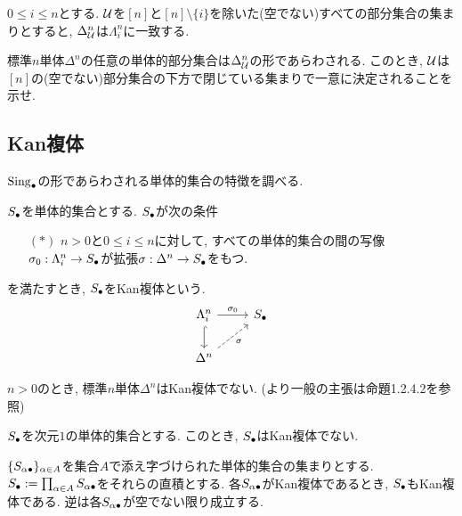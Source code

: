 \documentclass[uplatex, a4paper, 14Q, dvipdfmx]{jsreport}
\begin{document}
\begin{example}
  $0 \leq i \leq n$とする. 
  $\calU$を$[n]$と$[n] \setminus \{i\}$を除いた(空でない)すべての部分集合の集まりとすると, $\Delta^n_\calU$は$\Lambda^n_i$に一致する.
\end{example}

\begin{exe}
  標準$n$単体$\Delta^n$の任意の単体的部分集合は$\Delta^n_\calU$の形であらわされる.
  このとき, $\calU$は$[n]$の(空でない)部分集合の下方で閉じている集まりで一意に決定されることを示せ. 
\end{exe}

\subsection{Kan複体}

$\Sing_\bullet$の形であらわされる単体的集合の特徴を調べる. 

\begin{definition}
  $\S$を単体的集合とする. 
  $\S$が次の条件
  \begin{itemize}
    \item[$(\ast)$] $n > 0$と$0 \leq i \leq n$に対して, すべての単体的集合の間の写像$\si_0: \Lambda^n_i \to \S$が拡張$\si: \Delta^n \to \S$をもつ. 
  \end{itemize}
  を満たすとき, $\S$をKan複体という. 
  \[\begin{tikzcd}
    {\Lambda^n_i} & {\S} \\
    {\Delta^n}
    \arrow["\si_0", from=1-1, to=1-2]
    \arrow[hook, from=1-1, to=2-1]
    \arrow["\si"', dashed, from=2-1, to=1-2]
  \end{tikzcd}\]
\end{definition}

\begin{exe}
  $n>0$のとき, 標準$n$単体$\Delta^n$はKan複体でない. (より一般の主張は命題1.2.4.2を参照)
\end{exe}

\begin{example}
  $\S$を次元$1$の単体的集合とする. 
  このとき, $\S$はKan複体でない. 
\end{example}

\begin{example}
  $\{S_{\al \bullet}\}_{\al \in A}$を集合$A$で添え字づけられた単体的集合の集まりとする. 
  $\S:=\prod_{\al \in A}S_{\al \bullet}$をそれらの直積とする. 
  各$S_{\al \bullet}$がKan複体であるとき, $\S$もKan複体である. 
  逆は各$S_{\al \bullet}$が空でない限り成立する. 
\end{example}
\end{document}
